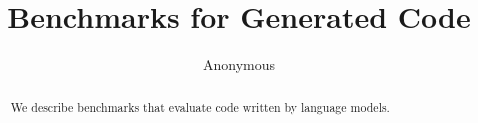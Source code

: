 \documentclass{article}
\title{Benchmarks for Generated Code}
\author{Anonymous}
\date{}
\begin{document}
\maketitle
\begin{abstract}
We describe benchmarks that evaluate code written by language models.
\end{abstract}



\end{document}
